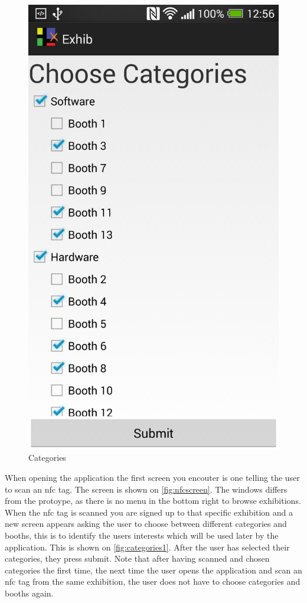 \begin{figure}[H]
\begin{minipage}[b]{0.5\columnwidth}
\includegraphics[width=0.7\columnwidth]{img/finaldesign/categories.png}
\caption{Categories}
\label{fig:categories1}
\end{minipage}
\end{figure}

When opening the application the first screen you encouter is one telling the user to scan an \ac{nfc} tag. The screen is shown on \autoref{fig:nfcscreen}. The windows differs from the protoype, as there is no menu in the bottom right to browse exhibitions. When the \ac{nfc} tag is scanned you are signed up to that specific exhibition and a new screen appears asking the user to choose between different categories and booths, this is to identify the users interests which will be used later by the application. This is shown on \autoref{fig:categories1}. After the user has selected their categories, they press submit. Note that after having scanned and chosen categories the first time, the next time the user opens the application and scan an \ac{nfc} tag from the same exhibition, the user does not have to choose categories and booths again.

